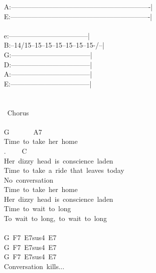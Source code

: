 {A:-------------------------------------------------------------|\\
E:-------------------------------------------------------------|\\
\\
e:-----------------------------------|\\
B:--14/15--15--15--15--15--15--15-/--|\\
G:-----------------------------------|\\
D:-----------------------------------|\\
A:-----------------------------------|\\
E:-----------------------------------|\\
\\
\\
\lbrack\ Chorus\rbrack\\
\\
G\ \ \ \ \ \ \ A7\ \ \ \ \ \ \ \\
Time\ to\ take\ her\ home\\
. \ \ \ \ C\ \ \ \ \ \ \ \ \ \ \ \ \ \ \ \ \ \ \ \ \ \ \ \ \ \ \ \ \ \ \ \\
Her\ dizzy\ head\ is\ conscience\ laden\\
Time\ to\ take\ a\ ride\ that\ leaves\ today\\
No\ conversation\\
Time\ to\ take\ her\ home\\
Her\ dizzy\ head\ is\ conscience\ laden\\
Time\ to\ wait\ to\ long\\
To\ wait\ to\ long,\ to\ wait\ to\ long\\
\\
G\ F7\ E7sus4\ E7\\
G\ F7\ E7sus4\ E7\\
G\ F7\ E7sus4\ E7\\
Conversation\ kills...\\}
